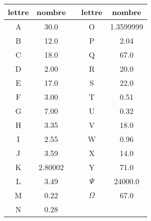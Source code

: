 \documentclass[11pt]{article}
\begin{document}
\begin{tabular}{cS[table-format=5.2,table-auto-round]ccS[table-format=5.2,table-auto-round]}
    \toprule
    lettre & {nombre} && lettre & {nombre} \\
    \midrule
    A	&	30.0	&&	O	&	1.3599999\\
    B	&	12.0	&&	P	&	2.04\\
    C	&	18.0	&&	Q	&	67.0\\
    D	&	2.00	&&	R	&	20.0\\
    E	&	17.0	&&	S	&	22.0\\
    F	&	3.00	&&	T	&	0.51\\
    G	&	7.00	&&	U	&	0.32\\
    H	&	3.35	&&	V	&	18.0\\
    I	&	2.55	&&	W	&	0.96\\
    J	&	3.59	&&	X	&	14.0\\
    K	&	2.80002	&&	Y	&	71.0\\
    L	&	3.49	&&$\Psi$&	24000.0\\
    M	&	0.22	&&$\Omega$&	67.0\\
    N	&	0.28	&&		&	\\
    \bottomrule
\end{tabular}
\end{document}
